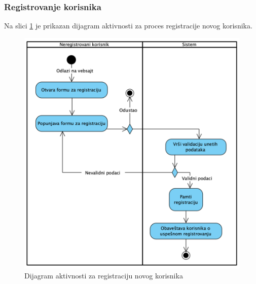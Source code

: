 \documentclass[a4paper, oneside]{article}
\begin{document}
\subsubsection{Registrovanje korisnika}
Na slici \ref{dakt_registr_korisnika} je prikazan dijagram aktivnosti za proces registracije novog korisnika.
\begin{figure}[h!]
    \centering
    \includegraphics[scale=0.64]{images/dakt_registr_korisnika.png}
    \caption{Dijagram aktivnosti za registraciju novog korisnika}
    \label{dakt_registr_korisnika}
\end{figure}
\end{document}
